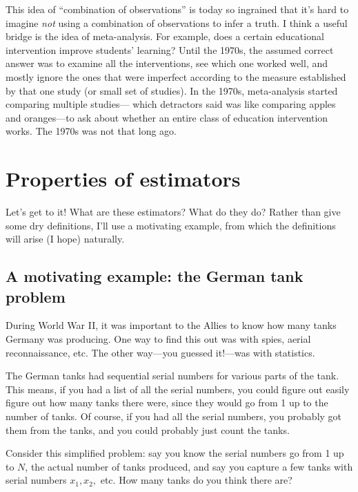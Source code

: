 This idea of ``combination of observations'' is today so ingrained that it's
hard to imagine \emph{not} using a combination of observations to infer a
truth. I think a useful bridge is the idea of meta-analysis. For example, does
a certain educational intervention improve students' learning? Until the
1970s, the assumed correct answer was to examine all the interventions, see
which one worked well, and mostly ignore the ones that were imperfect
according to the measure established by that one study (or small set of
studies). In the 1970s, meta-analysis started comparing multiple studies---
which detractors said was like comparing apples and oranges---to ask about
whether an entire class of education intervention works. The 1970s was not
that long ago.


\section{Properties of estimators}

Let's get to it! What are these estimators? What do they do? Rather than give
some dry definitions, I'll use a motivating example, from which the
definitions will arise (I hope) naturally.

\subsection{A motivating example: the German tank problem}

During World War II, it was important to the Allies to know how many tanks
Germany was producing. One way to find this out was with spies, aerial
reconnaissance, etc. The other way---you guessed it!---was with statistics.

The German tanks had sequential serial numbers for various parts of the tank.
This means, if you had a list of all the serial numbers, you could figure out
easily figure out how many tanks there were, since they would go from 1 up to
the number of tanks. Of course, if you had all the serial numbers, you
probably got them from the tanks, and you could probably just count the tanks.

Consider this simplified problem: say you know the serial numbers go from 1 up
to $N$, the actual number of tanks produced, and say you capture a few tanks
with serial numbers $x_1, x_2,$ etc. How many tanks do you think there
are?

